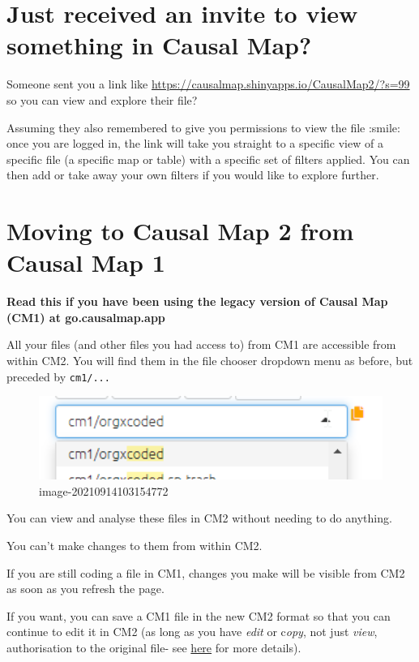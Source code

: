 \documentclass[
]{book}
\begin{document}
\hypertarget{xinvite}{%
\chapter{Just received an invite to view something in Causal Map?}\label{xinvite}}

Someone sent you a link like \url{https://causalmap.shinyapps.io/CausalMap2/?s=99} so you can view and explore their file?

Assuming they also remembered to give you permissions to view the file :smile: once you are logged in, the link will take you straight to a specific view of a specific file (a specific map or table) with a specific set of filters applied. You can then add or take away your own filters if you would like to explore further.

\hypertarget{moving-to-causal-map-2-from-causal-map-1}{%
\chapter{Moving to Causal Map 2 from Causal Map 1}\label{moving-to-causal-map-2-from-causal-map-1}}

\textbf{Read this if you have been using the legacy version of Causal Map (CM1) at go.causalmap.app}

All your files (and other files you had access to) from CM1 are accessible from within CM2. You will find them in the file chooser dropdown menu as before, but preceded by \texttt{cm1/...}

\begin{figure}
\centering
\includegraphics[width=6.77083in,height=\textheight]{_assets/image-20210914103154772.png}
\caption{image-20210914103154772}
\end{figure}

You can view and analyse these files in CM2 without needing to do anything.

You can't make changes to them from within CM2.

If you are still coding a file in CM1, changes you make will be visible from CM2 as soon as you refresh the page.

If you want, you can save a CM1 file in the new CM2 format so that you can continue to edit it in CM2 (as long as you have \emph{edit} or c\emph{opy}, not just \emph{view}, authorisation to the original file- see \protect\hyperlink{xpermissions}{here} for more details).
\end{document}

